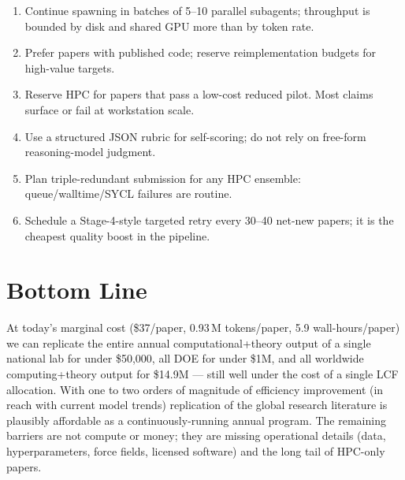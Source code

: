 \documentclass[11pt,letterpaper]{article}
\begin{document}
\begin{enumerate}
\item Continue spawning in batches of 5--10 parallel subagents; throughput is bounded by disk and shared GPU more than by token rate.
\item Prefer papers with published code; reserve reimplementation budgets for high-value targets.
\item Reserve HPC for papers that pass a low-cost reduced pilot. Most claims surface or fail at workstation scale.
\item Use a structured JSON rubric for self-scoring; do not rely on free-form reasoning-model judgment.
\item Plan triple-redundant submission for any HPC ensemble: queue/walltime/SYCL failures are routine.
\item Schedule a Stage-4-style targeted retry every 30--40 net-new papers; it is the cheapest quality boost in the pipeline.
\end{enumerate}

\section{Bottom Line}

At today's marginal cost (\$37/paper, 0.93\,M tokens/paper, 5.9 wall-hours/paper) we can replicate the entire annual computational+theory output of a single national lab for under \$50,000, all DOE for under \$1M, and all worldwide computing+theory output for \$14.9M --- still well under the cost of a single LCF allocation. With one to two orders of magnitude of efficiency improvement (in reach with current model trends) replication of the global research literature is plausibly affordable as a continuously-running annual program. The remaining barriers are not compute or money; they are missing operational details (data, hyperparameters, force fields, licensed software) and the long tail of HPC-only papers.
\end{document}
